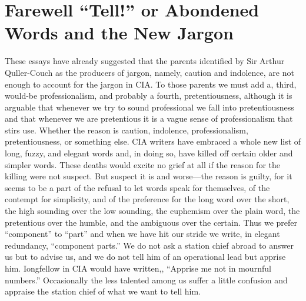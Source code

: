 \documentclass[
    oneside,
    11pt,
    draft
]{memoir}
\begin{document}
\chapter{Farewell \enquote{Tell!} or Abondened Words and the New Jargon}

These essays have already suggested that the parents identified by Sir Arthur Quller-Couch as the producers of jargon, namely, caution and indolence, are not enough to account for the jargon in CIA. To those parents we must add a, third,  would-be professionalism, and probably a fourth, pretentiousness, although it is arguable that whenever we try to sound professional we fall into pretentiousness and that whenever we are pretentious it is a vague sense of professionalism that stirs use. Whether the reason is caution, indolence, professionalism, pretentiousness, or something else. CIA writers have embraced a whole new list of long, fuzzy, and elegant words and, in doing so, have killed off certain older and simpler words. These deaths would excite no grief at all if the reason for the killing were not suspect. But suspect it is and worse---the reason is guilty, for it seems to be a part of the refusal to let words speak for themselves, of the contempt for simplicity, and of the preference for the long word over the short, the high sounding over the low sounding, the euphemism over the plain word, the pretentious over the humble, and the ambiguous over the certain. Thus we prefer \enquote{component} to \enquote{part} and when we have hit our stride we write, in elegant redundancy, \enquote{component parts.} We do not ask a station chief abroad to answer us but to advise us, and we do not tell him of an operational lead but apprise him. Iongfellow in CIA would have written,, \enquote{Apprise me not in mournful numbers.} Occasionally the less talented among us suffer a little confusion and appraise the station chief of what we want to tell him. 
\end{document}
